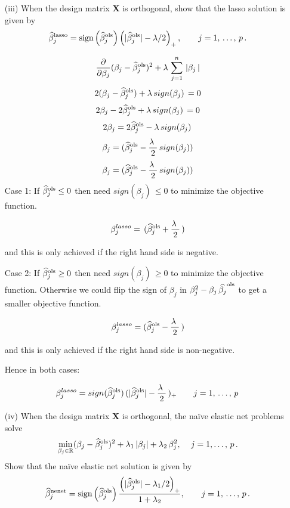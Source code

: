 \documentclass[11pt]{report}
\begin{document}
\begin{itemize}
\newpage
\item[(iii) ] When the design matrix $\mathbf{X}$ is orthogonal, show that the lasso solution is given by 
$$\widehat{\beta}_j^{\rm lasso}=\text{sign}\left(\widehat{\beta}_j^{\rm ols}\right)\left(|\widehat{\beta}_j^{\rm ols}|-\lambda/2 \right)_+,\qquad j=1,\,\dots,\,p\,. $$ 

$$\frac{\partial }{\partial \beta_j} ( \beta_j-\widehat{\beta}_j^{\rm ols})^2+\lambda\,\sum_{j=1}^n\,|\beta_j\,| $$
$$2(\beta_j-\widehat{\beta}_j^{\rm ols})+\lambda\,sign(\beta_j)\, = 0 $$
$$2\beta_j-2\widehat{\beta}_j^{\rm ols}+\lambda\,sign(\beta_j)\, = 0 $$
$$2\beta_j = 2\widehat{\beta}_j^{\rm ols} -\lambda\,sign(\beta_j)\,  $$
$$\beta_j = (\widehat{\beta}_j^{\rm ols} -\frac{\lambda\,\,}{2}\,sign(\beta_j))  $$
$$\beta_j = (\widehat{\beta}_j^{\rm ols} -\frac{\lambda\,\,}{2}\,sign(\beta_j))  $$
Case 1: If $\widehat{\beta}_j^{\rm ols} \leq 0$ then need $sign(\beta_j)\, \leq 0$ to minimize the objective function. 

$$\beta_j^{lasso} = \,(\widehat{\beta}_j^{\rm ols} + \frac{\lambda\,\,}{2}\,)  $$

and this is only achieved if the right hand side is negative. 

Case 2: If $\widehat{\beta}_j^{\rm ols} \geq 0$ then need $sign(\beta_j)\, \geq 0$ to minimize the objective function. Otherwise we could flip the sign of $\beta_j$ in $ \beta_j^2 - \beta_j\,\widehat{\beta_j}^{\rm ols}$ to get a smaller objective function.

$$\beta_j^{lasso} = (\widehat{\beta}_j^{\rm ols} -\frac{\lambda\,\,}{2}\,)  $$

and this is only achieved if the right hand side is non-negative.

Hence in both cases:

$$\beta_j^{lasso} = sign(\widehat{\beta}_j^{\rm ols})\,(|\widehat{\beta}_j^{\rm ols}| -\frac{\lambda\,\,}{2}\,)_+ \qquad j=1,\,\dots,\,p\, $$

\newpage
\item[(iv) ] When the design matrix $\mathbf{X}$ is orthogonal, the na\"{i}ve elastic net problems solve 
$$\min\limits_{\beta_j\in\mathbb{R}}(\beta_j-\widehat{\beta}_j^{\rm ols})^2+\lambda_1\,|\beta_j|+\lambda_2\,\beta_j^2,\,\quad j=1,\dots,\,p\,.$$
Show that the na\"{i}ve elastic net  solution is given by 
$$\widehat{\beta}_j^{\rm nenet}=\text{sign}\left(\widehat{\beta}_j^{\rm ols}\right)\dfrac{\left(|\widehat{\beta}_j^{\rm ols}|-\lambda_1/2 \right)_+}{1+\lambda_2},\qquad j=1,\,\dots,\,p\,. $$ 


\end{itemize}
\end{document}
